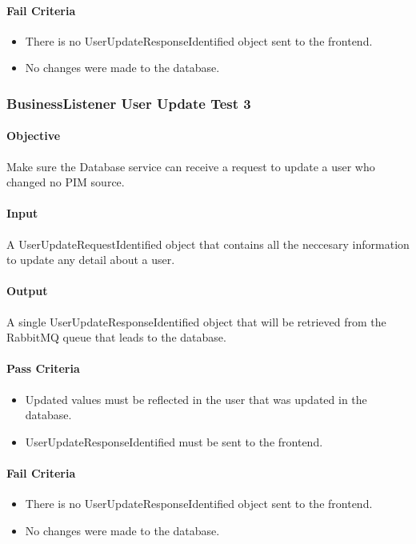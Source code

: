 \documentclass[hidelinks,english]{article}
\begin{document}
				\paragraph{Fail Criteria}
				\begin{itemize}
					\item There is no UserUpdateResponseIdentified object sent to the frontend.
					\item No changes were made to the database.
				\end{itemize}
				
			\subsubsection{BusinessListener User Update Test 3}\label{databasebusinesslistenerupdatetest3}
				\paragraph{Objective} Make sure the Database service can receive a request to update a user who changed no PIM source.
				\paragraph{Input} A UserUpdateRequestIdentified object that contains all the neccesary information to update any detail about a user.
				\paragraph{Output} A single UserUpdateResponseIdentified object that will be retrieved from the RabbitMQ queue that leads to the database.
				\paragraph{Pass Criteria}
				\begin{itemize}
					\item Updated values must be reflected in the user that was updated in the database.
					\item UserUpdateResponseIdentified must be sent to the frontend.
				\end{itemize}
				\paragraph{Fail Criteria}
				\begin{itemize}
					\item There is no UserUpdateResponseIdentified object sent to the frontend.
					\item No changes were made to the database.
				\end{itemize}
			
\end{document}
